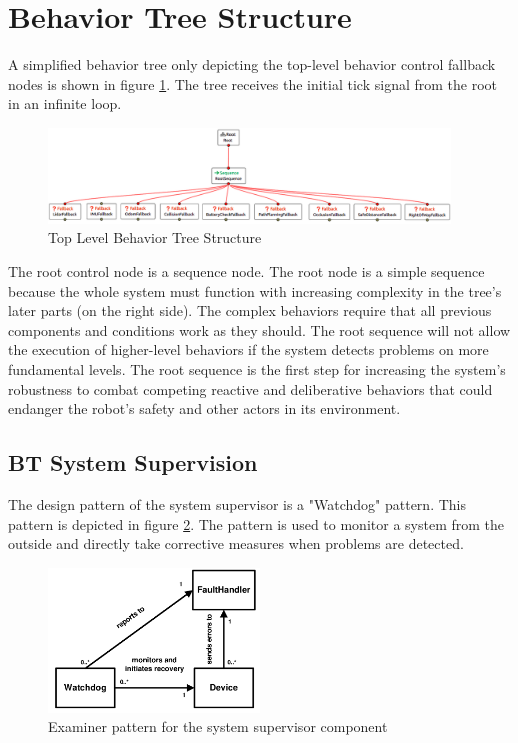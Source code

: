 \section{Behavior Tree Structure}

A simplified behavior tree only depicting the top-level behavior control fallback nodes is shown in figure \ref{fig:top_level_bt}. The tree receives the initial tick signal from the root in an infinite loop. 

\begin{figure}[ht]
	\centering
	\includegraphics[width=0.95\textwidth]{images/simplified_bt_inverted.png}
	\caption{Top Level Behavior Tree Structure}
	\label{fig:top_level_bt}
\end{figure}

The root control node is a sequence node. The root node is a simple sequence because the whole system must function with increasing complexity in the tree's later parts (on the right side). The complex behaviors require that all previous components and conditions work as they should. The root sequence will not allow the execution of higher-level behaviors if the system detects problems on more fundamental levels. The root sequence is the first step for increasing the system's robustness to combat competing reactive and deliberative behaviors that could endanger the robot's safety and other actors in its environment. 

\subsection{BT System Supervision}
\label{subsec:BT System Supervision}

The design pattern of the system supervisor is a "Watchdog" pattern. This pattern is depicted in figure \ref{fig:watchdog_pattern}. The pattern is used to monitor a system from the outside and directly take corrective measures when problems are detected. 

\begin{figure}[ht]
	\centering
	\includegraphics[width=0.5\textwidth]{images/watchdog_pattern.png}
	\caption{Examiner pattern for the system supervisor component \cite{konrad2003defining}}
	\label{fig:watchdog_pattern}
\end{figure}

